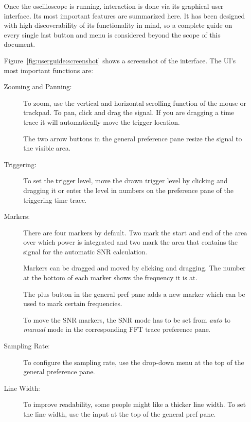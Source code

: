 Once the oscilloscope  is running, interaction is done via  its graphical user
interface. Its  most important  features  are summarized  here.   It has  been
designed with high discoverability of its functionality in mind, so a complete
guide on every single  last button and menu is considered  beyond the scope of
this document.

Figure~\ref{fig:userguide:screenshot}  shows a  screenshot  of the  interface.
The UI's most important functions are:
\begin{description}
    \item[Zooming and Panning:]
        To zoom,  use the  vertical and horizontal  scrolling function  of the
        mouse or  trackpad.  To  pan, click  and drag  the signal. If  you are
        dragging a time trace it will automatically move the trigger location.

        The two arrow buttons in the general preference pane resize the signal
        to the visible area.
    \item[Triggering:]
        To set the trigger level, move the drawn trigger level by clicking and
        dragging it  or enter the level  in numbers on the  preference pane of
        the triggering time trace.
    \item[Markers:]
        There are four  markers by default. Two mark the start  and end of the
        area  over which  power  is  integrated and  two  mark  the area  that
        contains the signal for the automatic SNR calculation.

        Markers can be dragged and  moved by clicking and dragging. The number
        at the bottom of each marker shows the frequency it is at.

        The plus button in  the general pref pane adds a  new marker which can
        be used to mark certain frequencies.

        To move the SNR  markers, the SNR mode has to  be set from \emph{auto}
        to \emph{manual} mode in the corresponding FFT trace preference pane.
    \item[Sampling Rate:]
        To configure the  sampling rate, use the drop-down menu  at the top of
        the general preference pane.
    \item[Line Width:]
        To  improve  readability,  some  people  might  like  a  thicker  line
        width. To set the line width, use the  input at the top of the general
        pref pane.
\end{description}

